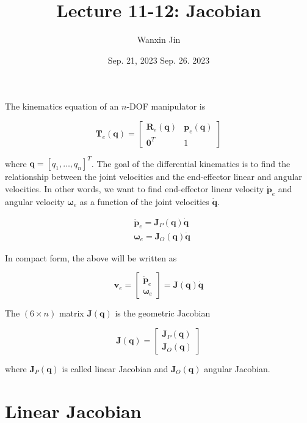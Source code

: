 \documentclass[10pt]{article}
\begin{document}
\title{Lecture 11-12: Jacobian}
\date{Sep. 21, 2023 \quad Sep. 26. 2023 }
\author{Wanxin Jin}
\maketitle


The kinematics equation of  an $n$-DOF manipulator is

$$
\boldsymbol{T}_{e}(\boldsymbol{q})=\left[\begin{array}{cc}
\boldsymbol{R}_{e}(\boldsymbol{q}) & \boldsymbol{p}_{e}(\boldsymbol{q}) \\
\mathbf{0}^{T} & 1
\end{array}\right]
$$

where $\boldsymbol{q}=\left[q_{1},\ldots, q_{n}\right]^{T}$. The goal of the differential kinematics is to find the relationship between the joint velocities and the end-effector linear and angular velocities. In other words, we want to find end-effector linear velocity $\dot{\boldsymbol{p}}_{e}$ and angular velocity $\boldsymbol{\omega}_{e}$ as a function of the joint velocities $\dot{\boldsymbol{q}}$.

$$
\begin{aligned}
& \dot{\boldsymbol{p}}_{e}=\boldsymbol{J}_{P}(\boldsymbol{q}) \dot{\boldsymbol{q}} \\
& \boldsymbol{\omega}_{e}=\boldsymbol{J}_{O}(\boldsymbol{q}) \dot{\boldsymbol{q}}
\end{aligned}
$$

In compact form, the above will be written as

$$
\boldsymbol{v}_{e}=\left[\begin{array}{c}
\dot{\boldsymbol{p}}_{e} \\
\boldsymbol{\omega}_{e}
\end{array}\right]=\boldsymbol{J}(\boldsymbol{q}) \dot{\boldsymbol{q}}
$$

The $(6 \times n)$ matrix $\boldsymbol{J}(\boldsymbol{q})$ is the  geometric Jacobian

$$
    \boldsymbol{J}(\boldsymbol{q})=\left[\begin{array}{l}
\boldsymbol{J}_{P}(\boldsymbol{q}) \\
\boldsymbol{J}_{O}(\boldsymbol{q})
\end{array}\right]
$$

where $\boldsymbol{J}_{P}(\boldsymbol{q})$ is called linear Jacobian and $\boldsymbol{J}_{O}(\boldsymbol{q})$ angular Jacobian.


\section{Linear Jacobian}
\end{document}
